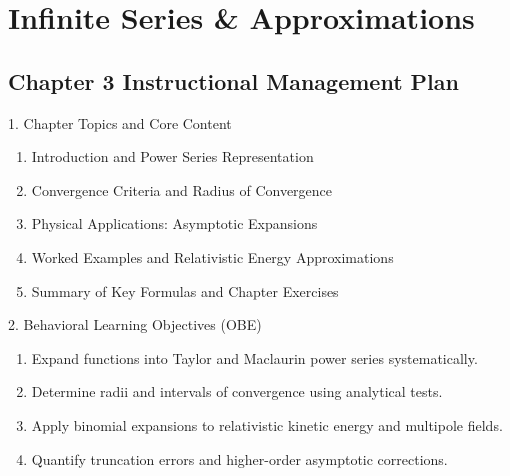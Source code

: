\chapter{Infinite Series \& Approximations}

\section*{Chapter 3 Instructional Management Plan}

\begin{planbox}[colframe=rbruNavy, colbacktitle=rbruNavy]{1. Chapter Topics and Core Content}
\begin{enumerate}[topsep=2pt, itemsep=1pt, partopsep=0pt, parsep=0pt, leftmargin=1.5em]
    \item Introduction and Power Series Representation
    \item Convergence Criteria and Radius of Convergence
    \item Physical Applications: Asymptotic Expansions
    \item Worked Examples and Relativistic Energy Approximations
    \item Summary of Key Formulas and Chapter Exercises
\end{enumerate}
\end{planbox}

\begin{planbox}[colframe=rbruGreen, colbacktitle=rbruGreen]{2. Behavioral Learning Objectives (OBE)}
\begin{enumerate}[topsep=2pt, itemsep=1pt, partopsep=0pt, parsep=0pt, leftmargin=1.5em]
    \item Expand functions into Taylor and Maclaurin power series systematically.
    \item Determine radii and intervals of convergence using analytical tests.
    \item Apply binomial expansions to relativistic kinetic energy and multipole fields.
    \item Quantify truncation errors and higher-order asymptotic corrections.
\end{enumerate}
\end{planbox}

